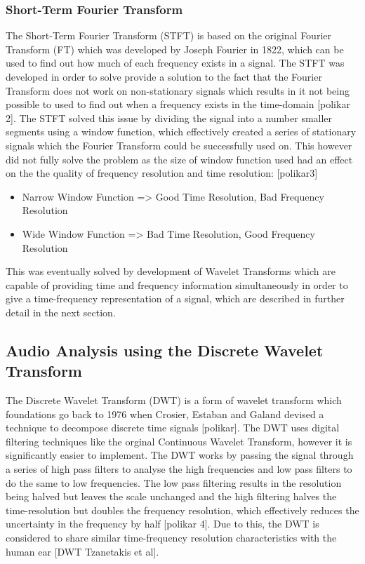 \documentclass[a4paper, 11pt]{article}
\begin{document}
\subsubsection{Short-Term Fourier Transform}
The Short-Term Fourier Transform (STFT) is based on the original Fourier Transform (FT) which was developed by Joseph Fourier in 1822, which can be used to find out how much of each frequency exists in a signal. The STFT was developed in order to solve provide a solution to the fact that the Fourier Transform does not work on non-stationary signals which results in it not being possible to used to find out when a frequency exists in the time-domain [polikar 2]. The STFT solved this issue by dividing the signal into a number smaller segments using a window function, which effectively created a series of stationary signals which the Fourier Transform could be successfully used on. This however did not fully solve the problem as the size of window function used had an effect on the the quality of frequency resolution and time resolution:
[polikar3]
\begin{itemize}
\item Narrow Window Function =>  Good Time Resolution, Bad Frequency Resolution
\item Wide Window Function =>  Bad Time Resolution, Good Frequency Resolution
\end{itemize}

This was eventually solved by development of Wavelet Transforms which are capable of providing time and frequency information simultaneously in order to give a time-frequency representation of a signal, which are described in further detail in the next section.

\subsection{Audio Analysis using the Discrete Wavelet Transform}
The Discrete Wavelet Transform (DWT) is a form of wavelet transform which foundations go back to 1976 when Crosier, Estaban and Galand devised a technique to decompose discrete time signals [polikar]. The DWT uses digital filtering techniques like the orginal Continuous Wavelet Transform, however it is significantly easier to implement. The DWT works by passing the signal through a series of high pass filters to analyse the high frequencies and low pass filters to do the same to low frequencies. The low pass filtering results in the resolution being halved but leaves the scale unchanged and the high filtering halves the time-resolution but doubles the frequency resolution, which effectively reduces the uncertainty in the frequency by half [polikar 4]. Due to this, the DWT is considered to share similar time-frequency resolution characteristics with the human ear [DWT Tzanetakis et al].
\end{document}
